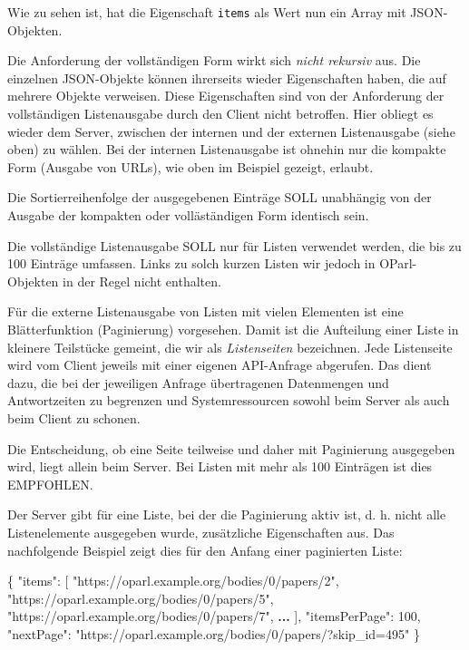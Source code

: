 \documentclass[,a4paper]{article}
\newenvironment{Shaded}{}{}
\newcommand{\DataTypeTok}[1]{\textcolor[rgb]{0.56,0.13,0.00}{{#1}}}
\newcommand{\DecValTok}[1]{\textcolor[rgb]{0.25,0.63,0.44}{{#1}}}
\newcommand{\StringTok}[1]{\textcolor[rgb]{0.25,0.44,0.63}{{#1}}}
\newcommand{\OtherTok}[1]{\textcolor[rgb]{0.00,0.44,0.13}{{#1}}}
\newcommand{\FunctionTok}[1]{\textcolor[rgb]{0.02,0.16,0.49}{{#1}}}
\newcommand{\ErrorTok}[1]{\textcolor[rgb]{1.00,0.00,0.00}{\textbf{{#1}}}}
\begin{document}
Wie zu sehen ist, hat die Eigenschaft \texttt{items} als Wert nun ein
Array mit JSON-Objekten.

Die Anforderung der vollständigen Form wirkt sich \emph{nicht rekursiv}
aus. Die einzelnen JSON-Objekte können ihrerseits wieder Eigenschaften
haben, die auf mehrere Objekte verweisen. Diese Eigenschaften sind von
der Anforderung der vollständigen Listenausgabe durch den Client nicht
betroffen. Hier obliegt es wieder dem Server, zwischen der internen und
der externen Listenausgabe (siehe oben) zu wählen. Bei der internen
Listenausgabe ist ohnehin nur die kompakte Form (Ausgabe von URLs), wie
oben im Beispiel gezeigt, erlaubt.

Die Sortierreihenfolge der ausgegebenen Einträge SOLL unabhängig von der
Ausgabe der kompakten oder volläständigen Form identisch sein.

Die vollständige Listenausgabe SOLL nur für Listen verwendet werden, die
bis zu 100 Einträge umfassen. Links zu solch kurzen Listen wir jedoch in
OParl-Objekten in der Regel nicht enthalten.


Für die externe Listenausgabe von Listen mit vielen Elementen ist eine
Blätterfunktion (Paginierung) vorgesehen. Damit ist die Aufteilung einer
Liste in kleinere Teilstücke gemeint, die wir als \emph{Listenseiten}
bezeichnen. Jede Listenseite wird vom Client jeweils mit einer eigenen
API-Anfrage abgerufen. Das dient dazu, die bei der jeweiligen Anfrage
übertragenen Datenmengen und Antwortzeiten zu begrenzen und
Systemressourcen sowohl beim Server als auch beim Client zu schonen.

Die Entscheidung, ob eine Seite teilweise und daher mit Paginierung
ausgegeben wird, liegt allein beim Server. Bei Listen mit mehr als 100
Einträgen ist dies EMPFOHLEN.

Der Server gibt für eine Liste, bei der die Paginierung aktiv ist, d. h.
nicht alle Listenelemente ausgegeben wurde, zusätzliche Eigenschaften
aus. Das nachfolgende Beispiel zeigt dies für den Anfang einer
paginierten Liste:

\begin{Shaded}
\begin{Highlighting}[]
\FunctionTok{\{}
    \DataTypeTok{"items"}\FunctionTok{:} \OtherTok{[}
        \StringTok{"https://oparl.example.org/bodies/0/papers/2"}\OtherTok{,}
        \StringTok{"https://oparl.example.org/bodies/0/papers/5"}\OtherTok{,}
        \StringTok{"https://oparl.example.org/bodies/0/papers/7"}\OtherTok{,}
        \ErrorTok{...}
    \OtherTok{]}\FunctionTok{,}
    \DataTypeTok{"itemsPerPage"}\FunctionTok{:} \DecValTok{100}\FunctionTok{,}
    \DataTypeTok{"nextPage"}\FunctionTok{:} \StringTok{"https://oparl.example.org/bodies/0/papers/?skip_id=495"}
\FunctionTok{\}}
\end{Highlighting}
\end{Shaded}
\end{document}
